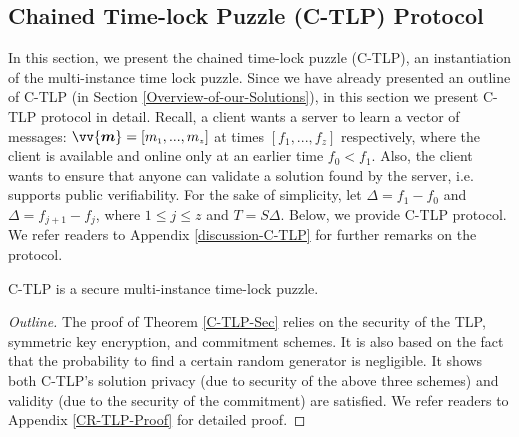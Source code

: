 \vspace{-4mm}

\subsection{Chained  Time-lock Puzzle (C-TLP) Protocol}\label{Section::C-TLP-protocol}

In this section, we present the chained  time-lock puzzle (C-TLP), an instantiation of the multi-instance time lock puzzle. Since we have already presented an outline of C-TLP (in Section \ref{Overview-of-our-Solutions}), in this section we present C-TLP protocol in detail.  Recall, a client wants a server to learn a vector of messages: $\vv{\bm{m}}=[m_{\scriptscriptstyle 1},...,m_{\scriptscriptstyle z}]$ at times  $[f_{\scriptscriptstyle 1},...,f_{\scriptscriptstyle z}]$ respectively, where the client is available and online only at an earlier time $f_{\scriptscriptstyle 0}< f_{\scriptscriptstyle 1}$.  Also, the client wants to ensure that anyone can validate a solution found by the  server, i.e. supports public verifiability. For the sake of simplicity, let $\Delta=f_{\scriptscriptstyle 1}-f_{\scriptscriptstyle 0}$ and $\Delta=f_{\scriptscriptstyle j+1}-f_{\scriptscriptstyle j}$, where $1\leq j \leq z$ and $T=S \Delta$. Below, we provide C-TLP protocol. We refer readers to Appendix \ref{discussion-C-TLP} for further remarks on the protocol. 




   \begin{theorem}\label{C-TLP-Sec}  C-TLP  is a secure multi-instance time-lock puzzle. 
   \end{theorem}
   
\begin{proof}[Outline]
The proof of Theorem \ref{C-TLP-Sec} relies on the security of the TLP, symmetric key encryption, and commitment schemes. It is also based on the fact that the probability to  find a certain random generator is negligible. It shows both C-TLP's solution privacy (due to security of the above three schemes) and validity (due to the security of the commitment) are satisfied.  We refer readers to Appendix \ref{CR-TLP-Proof} for  detailed proof. 
\end{proof}

